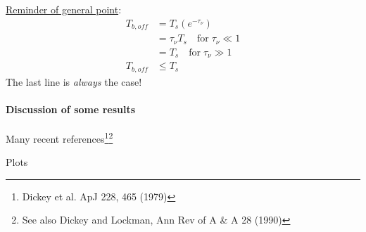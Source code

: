 \documentclass[12pt]{article}
\newcommand{\mar}[1]{\hspace{0pt}\marginpar{-\textcolor{black}{#1}-}}
\begin{document}
\underline{Reminder of general point}:
\begin{align*}
    T_{b,off} &= T_{s} \left( e^{-\tau_{\nu}} \right)\\
    &= \tau_{\nu}T_{s}\quad \mathrm{for}\; \tau_{\nu} \ll 1\\
    &= T_{s}\quad \mathrm{for}\; \tau_{\nu} \gg 1\\
    T_{b,off} &\leq T_{s}
\end{align*}
The last line is \emph{always} the case!

\paragraph{Discussion of some results}
Many recent references\footnote{
    Dickey et al. ApJ 228, 465 (1979)}\footnote{
    See also Dickey and Lockman, Ann Rev of A \& A 28 (1990)}

\mar{44}Plots
\end{document}
